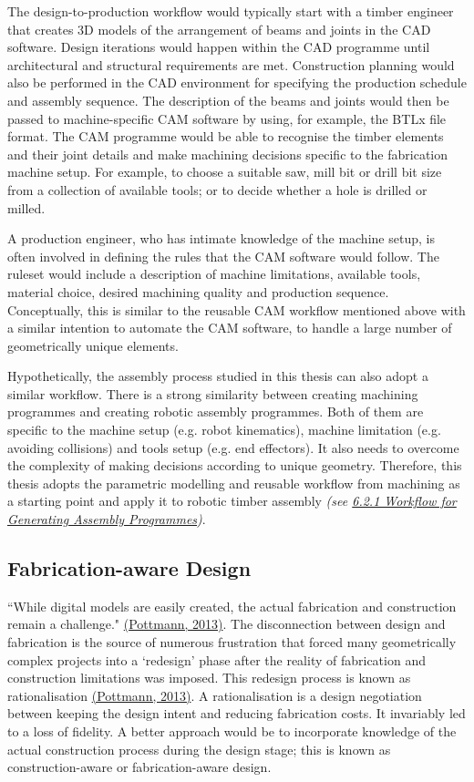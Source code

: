 \documentclass[11pt]{book}
\begin{document}
The design-to-production workflow would typically start with a timber engineer that creates 3D models of the arrangement of beams and joints in the CAD software. Design iterations would happen within the CAD programme until architectural and structural requirements are met. Construction planning would also be performed in the CAD environment for specifying the production schedule and assembly sequence. The description of the beams and joints would then be passed to machine-specific CAM software by using, for example, the BTLx file format. The CAM programme would be able to recognise the timber elements and their joint details and make machining decisions specific to the fabrication machine setup. For example, to choose a suitable saw, mill bit or drill bit size from a collection of available tools; or to decide whether a hole is drilled or milled.

A production engineer, who has intimate knowledge of the machine setup, is often involved in defining the rules that the CAM software would follow. The ruleset would include a description of machine limitations, available tools, material choice, desired machining quality and production sequence. Conceptually, this is similar to the reusable CAM workflow mentioned above with a similar intention to automate the CAM software, to handle a large number of geometrically unique elements. 

Hypothetically, the assembly process studied in this thesis can also adopt a similar workflow. There is a strong similarity between creating machining programmes and creating robotic assembly programmes. Both of them are specific to the machine setup (e.g. robot kinematics), machine limitation (e.g. avoiding collisions) and tools setup (e.g. end effectors). It also needs to overcome the complexity of making decisions according to unique geometry. Therefore, this thesis adopts the parametric modelling and reusable workflow from machining as a starting point and apply it to robotic timber assembly \textit{(see \underline{6.2.1 Workflow for Generating Assembly Programmes})}. 

\subsection{Fabrication-aware Design}

``While digital models are easily created, the actual fabrication and construction remain a challenge." \href{https://www.zotero.org/google-docs/?SxQXmE}{(Pottmann, 2013)}. The disconnection between design and fabrication is the source of numerous frustration that forced many geometrically complex projects into a ‘redesign’ phase after the reality of fabrication and construction limitations was imposed. This redesign process is known as rationalisation \href{https://www.zotero.org/google-docs/?JLgsyg}{(Pottmann, 2013)}. A rationalisation is a design negotiation between keeping the design intent and reducing fabrication costs. It invariably led to a loss of fidelity. A better approach would be to incorporate knowledge of the actual construction process during the design stage; this is known as construction-aware or fabrication-aware design.
\end{document}
